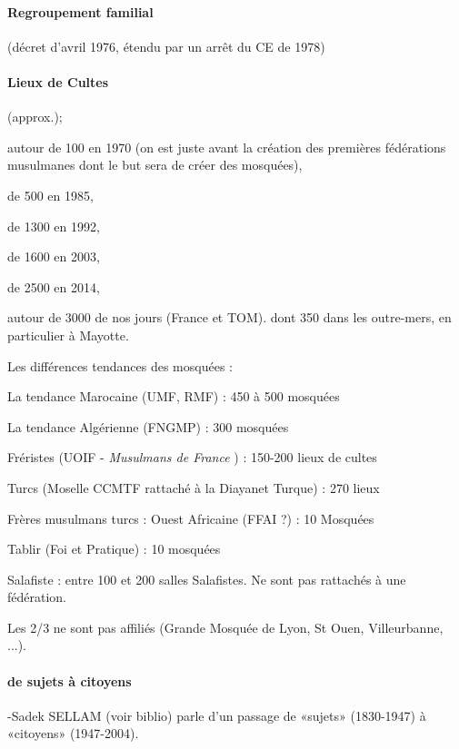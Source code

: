 \paragraph{Regroupement familial}  (décret d’avril 1976, étendu par un arrêt du CE de 1978)

\paragraph{Lieux de Cultes}
 (approx.); 
 \bi
 
\item  autour de 100 en 1970 (on est juste avant la création des premières fédérations musulmanes dont le but sera de créer des mosquées), \item de 500 en 1985, \item de 1300 en 1992, \item de 1600 en 2003, \item de 2500 en 2014, \item autour de 3000 de nos jours (France et TOM). dont 350 dans les outre-mers, en particulier à Mayotte. 
\ei

Les différences tendances des mosquées : 
\bi
\item La tendance Marocaine (UMF, RMF) : 450 à 500 mosquées
\item La tendance Algérienne (FNGMP) : 300 mosquées
\item Fréristes (UOIF - \textit{Musulmans de France} ) : 150-200 lieux de cultes
\item Turcs (Moselle CCMTF rattaché à la Diayanet Turque) : 270 lieux  
\item Frères musulmans turcs :
Ouest Africaine (FFAI ?)  : 10 Mosquées
\item Tablir (Foi et Pratique) : 10 mosquées
\item Salafiste : entre 100 et 200 salles Salafistes. Ne sont pas rattachés à une fédération.
\item Les 2/3 ne sont pas affiliés (Grande Mosquée de Lyon, St Ouen, Villeurbanne, ...). 
\ei


\paragraph{de sujets à citoyens}
-Sadek SELLAM (voir biblio) parle d’un passage de «sujets» (1830-1947) à «citoyens» (1947-2004).




